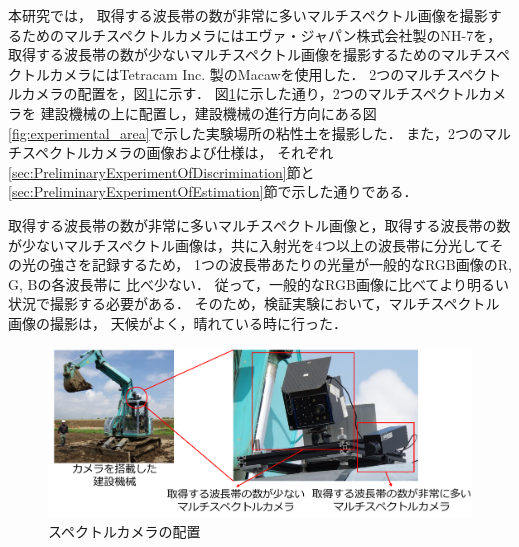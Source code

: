 \clearpage

本研究では，
取得する波長帯の数が非常に多いマルチスペクトル画像を撮影するためのマルチスペクトルカメラにはエヴァ・ジャパン株式会社製のNH-7を，
取得する波長帯の数が少ないマルチスペクトル画像を撮影するためのマルチスペクトルカメラにはTetracam Inc. 製のMacawを使用した．
2つのマルチスペクトルカメラの配置を，図\ref{fig:spectralcamera_arrangement}に示す．
図\ref{fig:spectralcamera_arrangement}に示した通り，2つのマルチスペクトルカメラを
建設機械の上に配置し，建設機械の進行方向にある図\ref{fig:experimental_area}で示した実験場所の粘性土を撮影した．
また，2つのマルチスペクトルカメラの画像および仕様は，
それぞれ\ref{sec:PreliminaryExperimentOfDiscrimination}節と\ref{sec:PreliminaryExperimentOfEstimation}節で示した通りである．

取得する波長帯の数が非常に多いマルチスペクトル画像と，取得する波長帯の数が少ないマルチスペクトル画像は，共に入射光を4つ以上の波長帯に分光してその光の強さを記録するため，
1つの波長帯あたりの光量が一般的なRGB画像のR, G, Bの各波長帯に
比べ少ない．
従って，一般的なRGB画像に比べてより明るい状況で撮影する必要がある．
そのため，検証実験において，マルチスペクトル画像の撮影は，
天候がよく，晴れている時に行った．

\begin{figure}[b]
      \begin{center}
            \hspace{1.5cm}\includegraphics[width=13.5cm]{./Ch5_ConeIndexEstimation/Fig/spectralcamera_arrangement_Ver_3_compressed.pdf} %
            \caption{スペクトルカメラの配置}
            \label{fig:spectralcamera_arrangement}
      \end{center}
\end{figure}

\clearpage


